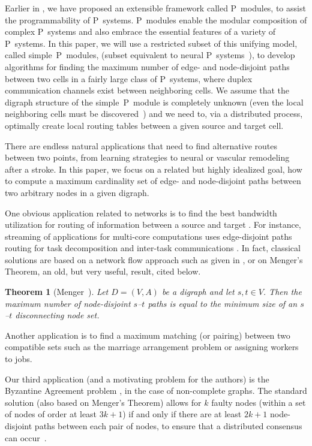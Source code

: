 \documentclass[preliminary,copyright,creativecommons]{eptcs}
\newtheorem{theorem}{Theorem}
\theoremstyle{remark}
\begin{document}
Earlier in \cite{DKN-JLAP2010}, we have proposed an extensible framework 
called P~modules, to assist the programmability of P~systems.
P~modules enable the modular composition of complex P~systems
and also embrace the essential features of a variety of P~systems.
In this paper, we will use a restricted subset of this unifying model,
called simple~P~modules,
(subset equivalent to neural P~systems~\cite{MartinVidePPR2003}),
to develop algorithms for finding the maximum number of edge- and node-disjoint paths
between two cells in a fairly large class of P~systems, where 
duplex communication channels exist between neighboring cells.  
We assume that the digraph structure of the simple~P~module is completely unknown
(even the local neighboring cells must be discovered~\cite{NDK-WMC2009}) 
and we need to, via a distributed process, optimally create local routing tables 
between a given source and target cell.

There are endless natural applications that need to find alternative
routes between two points, from learning strategies to
neural or vascular remodeling after a stroke.
In this paper, we focus on a related but highly idealized goal, 
how to compute a maximum cardinality set of edge- and node-disjoint paths 
between two arbitrary nodes in a given digraph.

One obvious application related to networks is to find the best 
bandwidth utilization for routing of information between a 
source and target \cite{Robacker56}.  
For instance, streaming of applications for multi-core computations 
uses edge-disjoint paths routing for task decomposition and inter-task
communications \cite{SeoT-IPDPS2009}.
In fact, classical solutions are based on a network flow approach such as
given in \cite{FordF1956,EdmondsK1972}, 
or on Menger's Theorem, an old, but very useful, result, cited below.

\begin{theorem}[Menger~\cite{Menger1927}]
Let $D = (V,A)$ be a digraph and let $s, t \in V$. 
Then the maximum number of node-disjoint $s$--$t$ paths is equal 
to the minimum size of an $s$--$t$ disconnecting node set.
\end{theorem}

Another application is to find a maximum matching (or pairing) 
between two compatible sets such as the marriage arrangement problem or 
assigning workers to jobs.

Our third application (and a motivating problem for the authors) 
is the Byzantine Agreement problem \cite{DKN-JLAP2010,DKN-CMC2010},
in the case of non-complete graphs.
The standard solution (also based on Menger's Theorem) allows for $k$ faulty 
nodes (within a set of nodes of order at least $3k+1$) if and only if there
are at least $2k+1$ node-disjoint paths between each pair of nodes, 
to ensure that a distributed consensus can occur~\cite{Lynch1996}.
\end{document}
